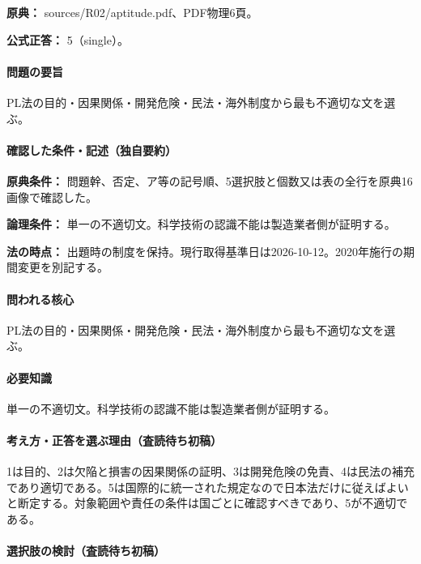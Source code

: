 \noindent\textbf{原典：} sources/R02/aptitude.pdf、PDF物理6頁。

\textbf{公式正答：} 5（single）。

\paragraph{問題の要旨} PL法の目的・因果関係・開発危険・民法・海外制度から最も不適切な文を選ぶ。

\paragraph{確認した条件・記述（独自要約）}\mbox{}\par

\noindent\textbf{原典条件：} 問題幹、否定、ア等の記号順、5選択肢と個数又は表の全行を原典16画像で確認した。\par

\noindent\textbf{論理条件：} 単一の不適切文。科学技術の認識不能は製造業者側が証明する。\par

\noindent\textbf{法の時点：} 出題時の制度を保持。現行取得基準日は2026-10-12。2020年施行の期間変更を別記する。\par

\paragraph{問われる核心} PL法の目的・因果関係・開発危険・民法・海外制度から最も不適切な文を選ぶ。

\paragraph{必要知識} 単一の不適切文。科学技術の認識不能は製造業者側が証明する。

\paragraph{考え方・正答を選ぶ理由（査読待ち初稿）} 1は目的、2は欠陥と損害の因果関係の証明、3は開発危険の免責、4は民法の補充であり適切である。5は国際的に統一された規定なので日本法だけに従えばよいと断定する。対象範囲や責任の条件は国ごとに確認すべきであり、5が不適切である。

\paragraph{選択肢の検討（査読待ち初稿）}\mbox{}\par

